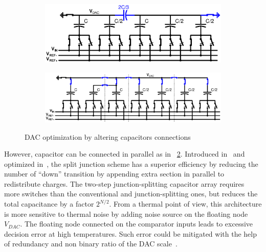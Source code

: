 \begin{figure}[htp]
	\centering
	\begin{subfigure}[b]{0.46\textwidth}
        \includegraphics[width=\textwidth]{sar_split_cap_dac.ps}
        \label{fig:split_capacitor}
    \end{subfigure}
    \begin{subfigure}[b]{0.52\textwidth}
        \includegraphics[width=\textwidth]{sar_split_junction_dac.ps}
        \label{fig:split_junction}
    \end{subfigure}
	\caption{DAC optimization by altering capacitors connections}
	\label{fig:sar_split_dac}
\end{figure}

However, capacitor can be connected in parallel as in \figurename~\ref{fig:split_junction}. Introduced in~\cite{Lee2008} and optimized in~\cite{Yu2010}, the split junction scheme has a superior efficiency by reducing the number of ``down'' transition by appending extra section in parallel to redistribute charges. The two-step junction-splitting capacitor array requires more switches than the conventional and junction-splitting ones, but reduces the total capacitance by a factor \(2^{N/2}\). From a thermal point of view, this architecture is more sensitive to thermal noise by adding noise source on the floating node \(V_{DAC}\). The floating node connected on the comparator inputs leads to excessive decision error at high temperatures. Such error could be mitigated with the help of redundancy and non binary ratio of the DAC scale~\cite{Zhang2014}.

